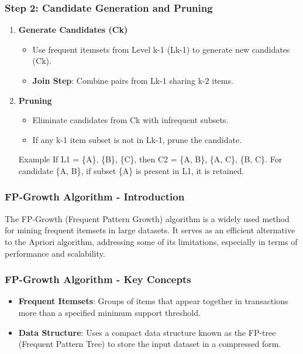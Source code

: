 \documentclass[aspectratio=169]{beamer}
\begin{document}
\begin{frame}[fragile]
    \frametitle{Step 2: Candidate Generation and Pruning}
    \begin{enumerate}
        \item \textbf{Generate Candidates (Ck)}
        \begin{itemize}
            \item Use frequent itemsets from Level k-1 (Lk-1) to generate new candidates (Ck).
            \item \textbf{Join Step}: Combine pairs from Lk-1 sharing k-2 items.
        \end{itemize}

        \item \textbf{Pruning}
        \begin{itemize}
            \item Eliminate candidates from Ck with infrequent subsets. 
            \item If any k-1 item subset is not in Lk-1, prune the candidate.
        \end{itemize}
        
        \begin{block}{Example}
            If L1 = \{A\}, \{B\}, \{C\}, then C2 = \{A, B\}, \{A, C\}, \{B, C\}.
            For candidate \{A, B\}, if subset \{A\} is present in L1, it is retained.
        \end{block}
    \end{enumerate}
\end{frame}

\begin{frame}[fragile]
  \frametitle{FP-Growth Algorithm - Introduction}
  The FP-Growth (Frequent Pattern Growth) algorithm is a widely used method for mining frequent itemsets in large datasets. It serves as an efficient alternative to the Apriori algorithm, addressing some of its limitations, especially in terms of performance and scalability.
\end{frame}

\begin{frame}[fragile]
  \frametitle{FP-Growth Algorithm - Key Concepts}
  \begin{itemize}
    \item \textbf{Frequent Itemsets}: Groups of items that appear together in transactions more than a specified minimum support threshold.
    \item \textbf{Data Structure}: Uses a compact data structure known as the FP-tree (Frequent Pattern Tree) to store the input dataset in a compressed form.
  \end{itemize}
\end{frame}
\end{document}
